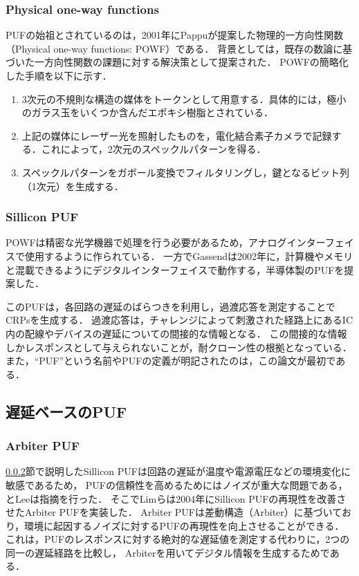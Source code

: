 \documentclass[technicalreport]{ieicej} %
\begin{document}
\subsubsection{Physical one-way functions}
PUFの始祖とされているのは，2001年にPappuが提案した物理的一方向性関数（Physical one-way functions: POWF）\cite{pappu}である．
背景としては，既存の数論に基づいた一方向性関数の課題に対する解決策として提案された．
POWFの簡略化した手順を以下に示す．
\begin{enumerate}
  \item 3次元の不規則な構造の媒体をトークンとして用意する．具体的には，極小のガラス玉をいくつか含んだエポキシ樹脂とされている．
  \item 上記の媒体にレーザー光を照射したものを，電化結合素子カメラで記録する．これによって，2次元のスペックルパターンを得る．
  \item スペックルパターンをガボール変換でフィルタリングし，鍵となるビット列（1次元）を生成する．
\end{enumerate}

\subsubsection{Sillicon PUF}
\label{SilliconPUF}
POWFは精密な光学機器で処理を行う必要があるため，アナログインターフェイスで使用するように作られている．
一方でGassendは2002年に，計算機やメモリと混載できるようにデジタルインターフェイスで動作する，半導体製のPUFを提案した\cite{gassend1}．

このPUFは，各回路の遅延のばらつきを利用し，過渡応答を測定することでCRPsを生成する．
過渡応答は，チャレンジによって刺激された経路上にあるIC内の配線やデバイスの遅延についての間接的な情報となる．
この間接的な情報しかレスポンスとして与えられないことが，耐クローン性の根拠となっている．
また，“PUF”という名前やPUFの定義が明記されたのは，この論文が最初である．
\subsection{遅延ベースのPUF}
\subsubsection{Arbiter PUF}
\ref{SilliconPUF}節で説明したSillicon PUFは回路の遅延が温度や電源電圧などの環境変化に敏感であるため，
PUFの信頼性を高めるためにはノイズが重大な問題である，とLeeは指摘を行った\cite{lee}．
そこでLimらは2004年にSillicon PUFの再現性を改善させたArbiter PUF\cite{lim}を実装した．
Arbiter PUFは差動構造（Arbiter）に基づいており，環境に起因するノイズに対するPUFの再現性を向上させることができる．
これは，PUFのレスポンスに対する絶対的な遅延値を測定する代わりに，2つの同一の遅延経路を比較し，
Arbiterを用いてデジタル情報を生成するためである．
\end{document}
